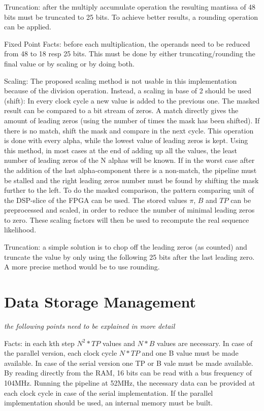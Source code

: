 \documentclass[mscthesis]{usiinfthesis}
\begin{document}
Truncation: after the multiply accumulate operation the resulting mantissa of
48 bits must be truncated to 25 bits. To achieve better results, a rounding
operation can be applied.

Fixed Point Facts:
before each multiplication, the operands need to be reduced from 48 to 18 resp
25 bits. This must be done by either truncating/rounding the final value or by
scaling or by doing both.

Scaling: The proposed scaling method is not usable in this implementation
because of the division operation. Instead, a scaling in base of 2 should be
used (shift): In every clock cycle a new value is added to the previous one.
The masked result can be compared to a bit stream of zeros. A match directly
gives the amount of leading zeros (using the number of times the mask has been
shifted). If there is no match, shift the mask and compare in the next cycle.
This operation is done with every alpha, while the lowest value of leading
zeros is kept. Using this method, in most cases at the end of adding up all the
values, the least number of leading zeros of the N alphas will be known. If in
the worst case after the addition of the last alpha-component there is
a non-match, the pipeline must be stalled and the right leading zeros number
must be found by shifting the mask further to the left. To do the masked
comparison, the pattern comparing unit of the DSP-slice of the FPGA can be
used. The stored values $ \pi $, $ B $ and $ TP $ can be preprocessed and
scaled, in order to reduce the number of minimal leading zeros to zero. These
scaling factors will then be used to recompute the real sequence likelihood.

Truncation: a simple solution is to chop off the leading zeros (as counted) and
truncate the value by only using the following 25 bits after the last leading
zero. A more precise method would be to use rounding.

\section{Data Storage Management}

\emph{\color{red}the following points need to be explained in more detail}

Facts:
in each kth step $ N^2*TP $ values and $ N*B $ values are necessary. In case of
the parallel version, each clock cycle $ N*TP $ and one B value must be made
available. In case of the serial version one TP or B vale must be made
available. By reading directly from the RAM, 16 bits can be read with a bus
frequency of 104MHz. Running the pipeline at 52MHz, the necessary data can be
provided at each clock cycle in case of the serial implementation. If the
parallel implementation should be used, an internal memory must be built.
\end{document}
